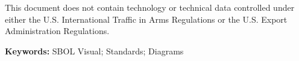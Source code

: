 \documentclass{jib}
\begin{document}
This document does not contain technology or technical data controlled under either the U.S. International Traffic in Arms Regulations or the U.S. Export Administration Regulations.

\textbf{Keywords:} SBOL Visual; Standards; Diagrams


\end{document}
